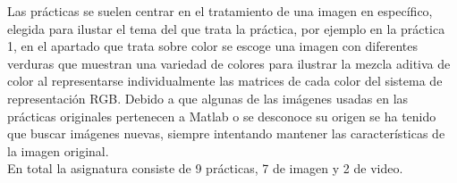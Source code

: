 \documentclass[a4paper,12pt]{report}
\begin{document}
Las prácticas se suelen centrar en el tratamiento de una imagen en específico, elegida para ilustar el tema del que trata la práctica, por ejemplo en la práctica 1, en el apartado que trata sobre color se escoge una imagen con diferentes verduras que muestran una variedad de colores para ilustrar la mezcla aditiva de color al representarse individualmente las matrices de cada color del sistema de representación RGB. Debido a que algunas de las imágenes usadas en las prácticas originales pertenecen a Matlab o se desconoce su origen se ha tenido que buscar imágenes nuevas, siempre intentando mantener las características de la imagen original.\\

En total la asignatura consiste de 9 prácticas, 7 de imagen y 2 de video. \\
\end{document}
